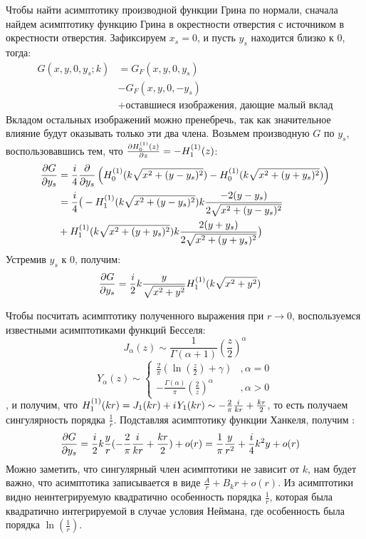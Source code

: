 Чтобы найти асимптотику производной функции Грина по нормали, сначала найдем асимптотику функцию Грина в окрестности отверстия с источником в окрестности отверстия. Зафиксируем $x_s = 0$, и пусть $y_s$ находится близко к $0$, тогда:
\begin{align*}
G(x, y, 0, y_s; k)
&= G_F(x, y, 0, y_s) \\
&- G_F(x, y, 0, -y_s) \\
&+ \text{оставшиеся изображения, дающие малый вклад}
\end{align*}
Вкладом остальных изображений можно пренебречь, так как значительное влияние будут оказывать только эти два члена. Возьмем производную $G$ по $y_s$, воспользовавшись тем, что $\pdv{H_{0}^{(1)}(z)}{z} = - H_{1}^{(1)}(z)$:
\begin{align*}
\pdv{G}{y_s}
&= \frac{i}{4} \pdv{}{y_s} \left( H_{0}^{(1)}(k \sqrt{x^2 + (y - y_s)^2}) - H_{0}^{(1)}(k \sqrt{x^2 + (y + y_s)^2}) \right) \\
&= \frac{i}{4} \big( -H_{1}^{(1)}(k \sqrt{x^2 + (y - y_s)^2}) k \frac{-2 (y - y_s)}{2 \sqrt{x^2 + (y - y_s)^2}} \\
&+ H_{1}^{(1)}(k \sqrt{x^2 + (y + y_s)^2}) k \frac{2 (y + y_s)}{2 \sqrt{x^2 + (y + y_s)^2}} \big)
\end{align*}
Устремив $y_s$ к 0, получим:
\begin{align*}
\pdv{G}{y_s} (x, y, 0, 0; k)
&= \frac{i}{2} k \frac{y}{\sqrt{x^2 + y^2}} H_{1}^{(1)}(k \sqrt{x^2 + y^2})
\end{align*}

Чтобы посчитать асимптотику полученного выражения при $r \to 0$, воспользуемся известными асимптотиками функций Бесселя:
\[
J_\alpha(z) \sim \frac{1}{\Gamma(\alpha+1)} \left( \frac{z}{2} \right) ^\alpha
\]
\[
Y_\alpha(z) \sim
\begin{cases}
\frac{2}{\pi} \left ( \ln \left (\frac{z}{2} \right ) + \gamma \right )  &, \alpha=0\\
-\frac{\Gamma(\alpha)}{\pi} \left( \frac{2}{z} \right) ^\alpha &, \alpha > 0
\end{cases}
\]
, и получим, что $H_{1}^{(1)}(k r) = J_1(k r) + {i\mkern1mu} Y_1(k r) \sim - \frac{2}{\pi} \frac{{i\mkern1mu} }{k r} + \frac{k r}{2}$, то есть получаем сингулярность порядка $\frac{1}{r}$. Подставляя асимптотику функции Ханкеля, получим :
\begin{align*}
\pdv{G}{y_s} (x, y, 0, 0; k)
&= \frac{i}{2} k \frac{y}{r} (- \frac{2}{\pi} \frac{{i\mkern1mu} }{k r} + \frac{k r}{2}) + o(r) = \frac{1}{\pi} \frac{y}{r^2} + \frac{i}{4} k^2 y + o(r)
\end{align*} 
Можно заметить, что сингулярный член асимптотики не зависит от $k$, нам будет важно, что асимптотика записывается в виде $\frac{A}{r} + B_k r + o(r)$. Из асимптотики видно неинтегрируемую квадратично особенность порядка $\frac{1}{r}$, которая была квадратично интегрируемой в случае условия Неймана, где особенность была порядка $\ln(\frac{1}{r})$.

